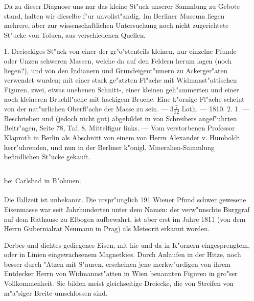 \documentclass[a4paper, 11pt, oneside, polutonikogreek, german]{article}
\begin{document}
\setlength{\leftskip}{10mm}
\setlength{\parindent}{0pt}

{\footnotesize Da zu dieser Diagnose uns nur das kleine St"uck unserer Sammlung zu Gebote stand, halten wir dieselbe f"ur unvollst"andig. Im Berliner Museum liegen mehrere, aber zur wissenschaftlichen Untersuchung noch nicht zugerichtete St"ucke von Toluca, aus verschiedenen Quellen.}

\setlength{\leftskip}{0pt}
\setlength{\parindent}{20pt}

1. Dreieckiges St"uck von einer der gr"o"stenteils kleinen, nur einzelne Pfunde oder Unzen schweren Massen, welche da auf den Feldern herum lagen (noch liegen?), und von den Indianern und Grundeigent"umern zu Ackerger"aten verwendet wurden; mit einer stark ge"atzten Fl"ache mit Widmanst"attischen Figuren, zwei, etwas unebenen Schnitt-, einer kleinen geh"ammerten und einer noch kleineren Bruchfl"ache mit hackigem Bruche. Eine k"ornige Fl"ache scheint von der nat"urlichen Oberfl"ache der Masse zu sein. --- $\mathfrak{3\frac{7}{32}}$ Loth. --- 1810. 2. 1. --- Beschrieben und (jedoch nicht gut) abgebildet in von Schreibers angef"uhrten Beitr"agen, Seite 78, Taf. 8, Mittelfigur links. --- Vom verstorbenen Professor Klaproth in Berlin als Abschnitt von einem von Herrn Alexander v. Humboldt herr"uhrenden, und nun in der Berliner k"onigl. Mineralien-Sammlung befindlichen St"ucke gekauft.
\subsection[\swabfamily {Elbogen.}]{}
\begin{center}

bei Carlsbad in B"ohmen.
\end{center}
\paragraph{}
Die Fallzeit ist unbekannt. Die urspr"unglich 191 Wiener Pfund schwer gewesene Eisenmasse war seit Jahrhunderten unter dem Namen: der verw"unschte Burggraf auf dem Rathause zu Elbogen aufbewahrt, ist aber erst im Jahre 1811 (von dem Herrn Gubernialrat Neumann in Prag) als Meteorit erkannt worden.

Derbes und dichtes gediegenes Eisen, mit hie und da in K"ornern eingesprengtem, oder in Linien eingewachsenem Magnetkies. Durch Anlaufen in der Hitze, noch besser durch "Atzen mit S"auren, erscheinen jene merkw"urdigen von ihrem Entdecker Herrn von Widmannst"atten in Wien benannten Figuren in gro"ser Vollkommenheit. Sie bilden meist gleichseitige Dreiecke, die von Streifen von m"a"siger Breite umschlossen sind.
\end{document}
